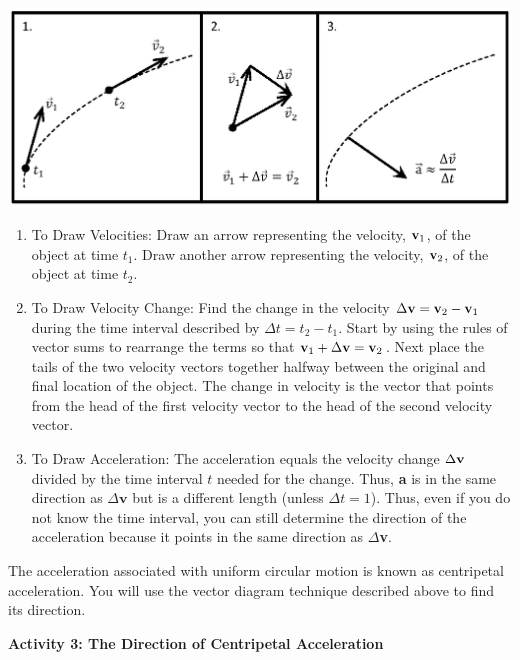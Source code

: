 \vspace{0.3cm}
{\par\centering \includegraphics{circ_motion/circ_motion_fig1_new.eps} \par}
\vspace{0.3cm}

\begin{enumerate}
\item To Draw Velocities: Draw an arrow representing the velocity, \( {\bf v}_{1} \), of
the object at time \( t_{1} \). Draw another arrow representing the velocity,
\( {\bf v}_{2} \), of the object at time \( t_{2} \). 
\item To Draw Velocity Change: Find the change in the velocity \( \Delta 
{\bf v}
= {\bf v}_{2}  - {\bf v}_{1} \) during the time interval described
by \( \Delta  t = t_{2} - t_{1} \). Start by using the rules of
vector sums to rearrange the terms so that ${\bf v}_{1} + \Delta {\bf v}
= {\bf v}_{2}$. Next place the tails of the two velocity vectors together
halfway between the original and final location of the object. The change in
velocity is the vector that points from the head of the first velocity vector
to the head of the second velocity vector. 
\item To Draw Acceleration: The acceleration equals the velocity change 
\( \Delta  {\bf v}\)
divided by the time interval $t$ needed for the change. Thus, \textbf{a} is in
the same direction as \( \Delta  \textbf{v}\) but is a different length (unless
 \( \Delta  t = 1\)). Thus, even if you do not know the time interval, you
can still determine the direction of the acceleration because it points in the
same direction as \( \Delta  \)\textbf{v}. 
\end{enumerate}
The acceleration associated with uniform circular motion is known as centripetal
acceleration. You will use the vector diagram technique described above to find
its direction. 

\pagebreak[2]
\textbf{Activity 3: The Direction of Centripetal Acceleration }


